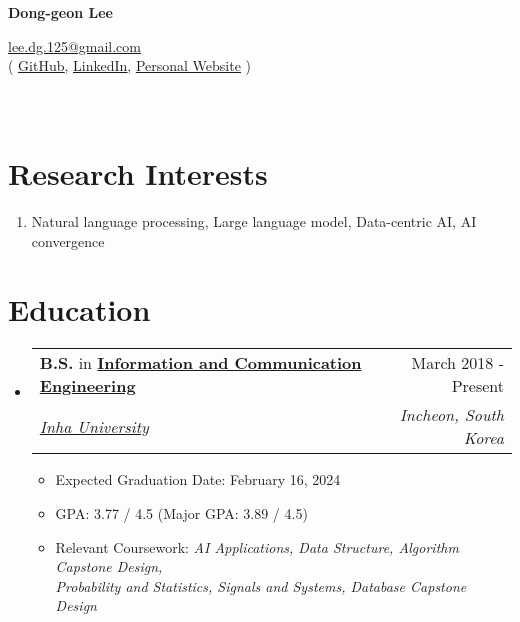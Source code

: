\documentclass[letterpaper,11pt]{article}
\makeatletter
\newcommand{\resumeSubheading}[4]{
  \vspace{-1pt}\item
    \begin{tabular*}{0.97\textwidth}{l@{\extracolsep{\fill}}r}
      #1 & #2 \\
      \textit{\small#3} & \textit{\small #4} \\
    \end{tabular*}\vspace{-5pt}
}
\makeatother
\begin{document}
    \pagestyle{fancy}
    \thispagestyle{fancy}
    
    \begin{center}
        {\LARGE{\bf{Dong-geon Lee}}\\}
    \end{center}
    
    \vspace{-14pt}
    
    \begin{center} 
        {\href{mailto:lee.dg.125@gmail.com}{lee.dg.125@gmail.com} \\}
        {
            ( \underline{\href{https://github.com/oneonlee}{GitHub}}, 
            \underline{\href{https://www.linkedin.com/in/dong-geon-lee/}{LinkedIn}},
            \underline{\href{https://sites.google.com/view/dg-lee/}{Personal Website}} )
        }
    \end{center}

    \section{\\Research Interests}
    \begin{enumerate}[noitemsep, leftmargin=*,label={}]
    \item{Natural language processing, Large language model, Data-centric AI, AI convergence}
    \end{enumerate}
    
    \section{Education}
    \begin{itemize}[leftmargin=*,label=]
        \resumeSubheading
        {\textbf{B.S.} in \textbf{\href{http://bit.ly/3Uu4LTi}{Information and Communication Engineering}}}{March 2018 - Present}{\href{https://eng.inha.ac.kr/eng/index.do}{Inha University}}{Incheon, South Korea}
            \begin{itemize}[label=\bullet]
                \item{Expected Graduation Date: February 16, 2024}
                \item{GPA: 3.77 / 4.5 (Major GPA: 3.89 / 4.5)}
                \item{Relevant Coursework: \textit{AI Applications, Data Structure, Algorithm Capstone Design, \\ Probability and Statistics, Signals and Systems, Database Capstone Design}}
            \end{itemize}
    \end{itemize}
    
\end{document}
